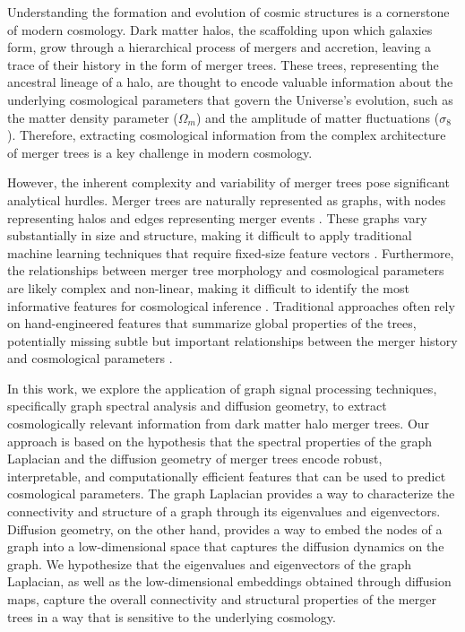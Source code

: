 \documentclass[twocolumn]{aastex631}
\begin{document}
Understanding the formation and evolution of cosmic structures is a cornerstone of modern cosmology. Dark matter halos, the scaffolding upon which galaxies form, grow through a hierarchical process of mergers and accretion, leaving a trace of their history in the form of merger trees. These trees, representing the ancestral lineage of a halo, are thought to encode valuable information about the underlying cosmological parameters that govern the Universe's evolution, such as the matter density parameter ($\Omega_m$) and the amplitude of matter fluctuations ($\sigma_8$). Therefore, extracting cosmological information from the complex architecture of merger trees is a key challenge in modern cosmology.

However, the inherent complexity and variability of merger trees pose significant analytical hurdles. Merger trees are naturally represented as graphs, with nodes representing halos and edges representing merger events \citep{parkinson2007generatingdarkmatterhalo,robles2022deeplearningapproachhalo}. These graphs vary substantially in size and structure, making it difficult to apply traditional machine learning techniques that require fixed-size feature vectors \citep{robles2022deeplearningapproachhalo}. Furthermore, the relationships between merger tree morphology and cosmological parameters are likely complex and non-linear, making it difficult to identify the most informative features for cosmological inference \citep{geda2025constructingmergertreesdensity}. Traditional approaches often rely on hand-engineered features that summarize global properties of the trees, potentially missing subtle but important relationships between the merger history and cosmological parameters \citep{parkinson2007generatingdarkmatterhalo,jung2024mergertreebasedgalaxymatching}.

In this work, we explore the application of graph signal processing techniques, specifically graph spectral analysis and diffusion geometry, to extract cosmologically relevant information from dark matter halo merger trees. Our approach is based on the hypothesis that the spectral properties of the graph Laplacian and the diffusion geometry of merger trees encode robust, interpretable, and computationally efficient features that can be used to predict cosmological parameters. The graph Laplacian provides a way to characterize the connectivity and structure of a graph through its eigenvalues and eigenvectors. Diffusion geometry, on the other hand, provides a way to embed the nodes of a graph into a low-dimensional space that captures the diffusion dynamics on the graph. We hypothesize that the eigenvalues and eigenvectors of the graph Laplacian, as well as the low-dimensional embeddings obtained through diffusion maps, capture the overall connectivity and structural properties of the merger trees in a way that is sensitive to the underlying cosmology.
\end{document}
